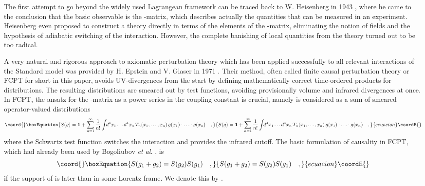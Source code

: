 \documentclass[a4paper,11pt]{article}
\begin{document}
The first attempt to go beyond the widely used
Lagrangean framework can be traced
back to W. Heisenberg in 1943 \cite{heisenberg},
where he came to the conclusion that the
basic observable is the \coordHE{}-matrix, which describes actually the
quantities that can be measured in an experiment. Heisenberg even proposed
to construct a theory directly in terms of the elements of the \coordHE{}-matrix,
eliminating the notion of fields and the hypothesis of adiabatic switching
of the interaction. However, the complete banishing of local quantities from
the theory turned out to be too radical.

A very natural and rigorous approach to axiomatic perturbation theory
which has been applied successfully to all relevant interactions of the
Standard model
\cite{appl1,appl2,appl3}
was provided by H. Epstein and V. Glaser in 1971 \cite{eg,eg2,scharf1}.
Their method, often called
finite causal perturbation theory or FCPT for short in this paper,
avoids UV-divergences from the start by
defining mathematically correct time-ordered products for distributions.
The resulting distributions are
smeared out by test functions, avoiding provisionally volume and infrared
divergences at once. 
In FCPT,
the ansatz for the \coordHE{}-matrix as a power 
series in the coupling constant is crucial, namely \coordHE{} is considered as a sum of 
smeared operator-valued distributions
\begin{equation}\coord{}\boxEquation{
S(g)={\bf 1}+\sum_{n=1}^{\infty}\frac{1}{n!} \int\!\! d^{4}x_{1}
\ldots d^{4}x_{n}\, T_{n}(x_{1},\ldots, x_{n})\,g(x_{1})\cdot\ldots\cdot 
g(x_{n})\quad  ,
}{
S(g)={\bf 1}+\sum_{n=1}^{\infty}\frac{1}{n!} \int\!\! d^{4}x_{1}
\ldots d^{4}x_{n}\, T_{n}(x_{1},\ldots, x_{n})\,g(x_{1})\cdot\ldots\cdot 
g(x_{n})\quad  ,
}{ecuacion}\coordE{}\end{equation}
where the  Schwartz test function \coordHE{} switches the 
interaction and provides the infrared cutoff.
The basic formulation of causality in FCPT, which had already been
used by Bogoliubov {\em{et al.}} \cite{bogol}, is
\begin{equation}\coord{}\boxEquation{
S(g_1+g_2)=S(g_2)S(g_1) \quad , \label{causality1}
}{
S(g_1+g_2)=S(g_2)S(g_1) \quad , }{ecuacion}\coordE{}\end{equation}
if the support of \coordHE{} is later than \coordHE{} in some
Lorentz frame. We denote this by \coordHE{}.
\end{document}
